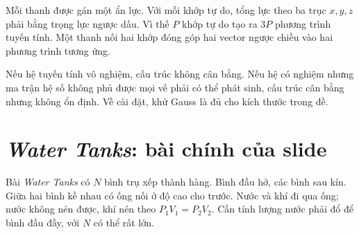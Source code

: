 \documentclass[11pt]{article}
\begin{document}
Mỗi thanh được gán một ẩn lực. Với mỗi khớp tự do, tổng lực theo ba trục
\(x,y,z\) phải bằng trọng lực ngược dấu. Vì thế \(P\) khớp tự do tạo ra \(3P\)
phương trình tuyến tính. Một thanh nối hai khớp đóng góp hai vector ngược
chiều vào hai phương trình tương ứng.

\begin{center}
\end{center}

Nếu hệ tuyến tính vô nghiệm, cấu trúc không cân bằng. Nếu hệ có nghiệm nhưng
ma trận hệ số không phủ được mọi vế phải có thể phát sinh, cấu trúc cân bằng
nhưng không ổn định. Về cài đặt, khử Gauss là đủ cho kích thước trong đề.

\section{\textit{Water Tanks}: bài chính của slide}

Bài \textit{Water Tanks} có \(N\) bình trụ xếp thành hàng. Bình đầu hở, các
bình sau kín. Giữa hai bình kề nhau có ống nối ở độ cao cho trước. Nước và
khí đi qua ống; nước không nén được, khí nén theo \(P_1V_1=P_2V_2\). Cần tính
lượng nước phải đổ để bình đầu đầy, với \(N\) có thể rất lớn.

\begin{center}
\end{center}
\end{document}
